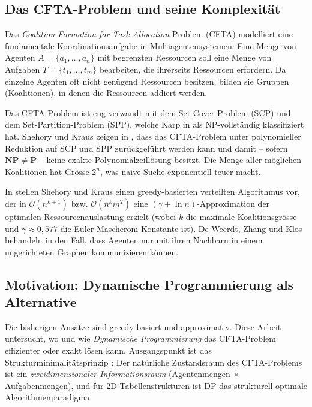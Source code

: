 ﻿\documentclass[a4paper,12pt]{article}
\theoremstyle{definition}
\begin{document}
\subsection{Das CFTA-Problem und seine Komplexit\"{a}t}

Das \emph{Coalition Formation for Task Allocation}-Problem (CFTA) modelliert
eine fundamentale Koordinationsaufgabe in Multiagentensystemen: Eine Menge
von Agenten $A = \{a_1, \ldots, a_n\}$ mit begrenzten Ressourcen soll eine
Menge von Aufgaben $T = \{t_1, \ldots, t_m\}$ bearbeiten, die ihrerseits
Ressourcen erfordern. Da einzelne Agenten oft nicht gen\"{u}gend Ressourcen
besitzen, bilden sie Gruppen (Koalitionen), in denen die Ressourcen addiert
werden.

Das CFTA-Problem ist eng verwandt mit dem Set-Cover-Problem (SCP) und dem
Set-Partition-Problem (SPP), welche Karp in \cite{karp72} als NP-vollst\"{a}ndig
klassifiziert hat. Shehory und Kraus zeigen in \cite{sk95}, dass das CFTA-Problem
unter polynomieller Reduktion auf SCP und SPP zur\"{u}ckgef\"{u}hrt werden kann und
damit -- sofern $\mathbf{NP} \neq \mathbf{P}$ -- keine exakte Polynomialzeill\"{o}sung
besitzt. Die Menge aller m\"{o}glichen Koalitionen hat Gr\"{o}sse $2^n$, was naive
Suche exponentiell teuer macht.

In \cite{sk98} stellen Shehory und Kraus einen greedy-basierten verteilten
Algorithmus vor, der in $\mathcal{O}(n^{k+1})$ bzw. $\mathcal{O}(n^k m^2)$
eine $(\gamma + \ln n)$-Approximation der optimalen Ressourcenauslastung
erzielt (wobei $k$ die maximale Koalitionsgr\"{o}sse und $\gamma \approx 0{,}577$
die Euler-Mascheroni-Konstante ist). De Weerdt, Zhang und Klos behandeln in
\cite{dwzk07} den Fall, dass Agenten nur mit ihren Nachbarn in einem
ungerichteten Graphen kommunizieren k\"{o}nnen.

\subsection{Motivation: Dynamische Programmierung als Alternative}

Die bisherigen Ans\"{a}tze sind greedy-basiert und approximativ. Diese Arbeit
untersucht, wo und wie \emph{Dynamische Programmierung} das CFTA-Problem
effizienter oder exakt l\"{o}sen kann. Ausgangspunkt ist das
Strukturminimalit\"{a}tsprinzip \cite{epp2026struktur}: Der nat\"{u}rliche
Zustandsraum des CFTA-Problems ist ein \emph{zweidimensionaler Informationsraum}
(Agentenmengen $\times$ Aufgabenmengen), und f\"{u}r 2D-Tabellenstrukturen ist
DP das strukturell optimale Algorithmenparadigma.
\end{document}
